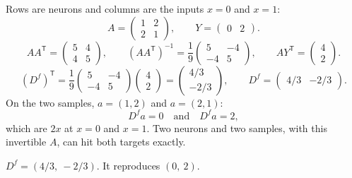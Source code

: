 \documentclass[11pt,letterpaper]{article}
\newcommand{\ans}[1]{\par\vspace{2pt}{\bfseries #1}\quad}
\begin{document}
\ans{3.}
Rows are neurons and columns are the inputs $x = 0$ and $x = 1$:
\[
A = \begin{pmatrix} 1 & 2 \\ 2 & 1 \end{pmatrix}, \qquad
Y = \begin{pmatrix} 0 & 2 \end{pmatrix}.
\]
\[
AA^{\mathsf T} = \begin{pmatrix} 5 & 4 \\ 4 & 5 \end{pmatrix}, \qquad
(AA^{\mathsf T})^{-1} = \frac19 \begin{pmatrix} 5 & -4 \\ -4 & 5 \end{pmatrix}, \qquad
AY^{\mathsf T} = \begin{pmatrix} 4 \\ 2 \end{pmatrix}.
\]
\[
(D^f)^{\mathsf T}
  = \frac19 \begin{pmatrix} 5 & -4 \\ -4 & 5 \end{pmatrix}
    \begin{pmatrix} 4 \\ 2 \end{pmatrix}
  = \begin{pmatrix} 4/3 \\ -2/3 \end{pmatrix},
\qquad
D^f = \begin{pmatrix} 4/3 & -2/3 \end{pmatrix}.
\]
On the two samples, $a = (1, 2)$ and $a = (2, 1)$:
\[
D^f a = 0 \quad \text{and} \quad D^f a = 2,
\]
which are $2x$ at $x = 0$ and $x = 1$. Two neurons and two samples, with this invertible $A$, can hit both targets exactly.
\begin{result}
$D^f = (4/3,\ -2/3)$. It reproduces $(0,\ 2)$.
\end{result}
\end{document}
